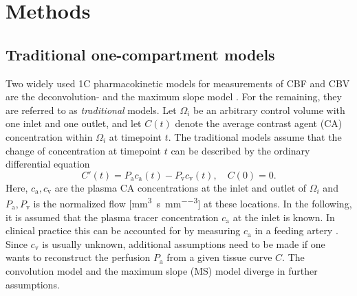 \documentclass[aps,prb,article,groupedaddress,showkeys]{revtex4}
\begin{document}

	

	
	
	\section{Methods} 


	\subsection{Traditional one-compartment models}\label{sec:traditional}
	Two widely used 1C pharmacokinetic models for measurements of CBF and CBV  are the deconvolution- and the maximum slope model \cite{Feng2013,Chen2011,kudo10}.
	For the remaining, they are referred to as \emph{traditional} models.	Let $\Omega_i$ be an arbitrary control volume with one inlet and one outlet, and let $C(t)$ denote the average contrast agent (CA) concentration within $\Omega_i$ at timepoint $t$.
	The traditional models assume that the change of concentration at timepoint $t$ can be described by the ordinary differential equation 
	\begin{equation}\label{eq:classicgeneral}
		C'(t) = P_{\mathrm{a}}c_\mathrm{a}(t) - P_{\mathrm{v}}c_{\mathrm{v}}(t), \quad C(0) = 0.
	\end{equation}
	Here, $c_\mathrm{a},c_{\mathrm{v}}$ are the plasma CA concentrations at the inlet and outlet of $\Omega_i$ and $P_{\mathrm{a}},P_{\mathrm{v}}$ is the normalized flow [\si{\milli\meter\cubed\per\second\per\milli\meter\cubed}] at these locations.
	In the following, it is assumed that the plasma tracer concentration $c_\mathrm{a}$ at the inlet is known.
	In clinical practice this can be accounted for by measuring $c_\mathrm{a}$ in a feeding artery \cite{ostergaard96}.
	Since $c_{\mathrm{v}}$ is usually unknown, additional assumptions need to be made if one wants to reconstruct the perfusion $P_{\mathrm{a}}$ from a given tissue curve $C$. The convolution model and the maximum slope (MS) model diverge in further assumptions.
\end{document}
